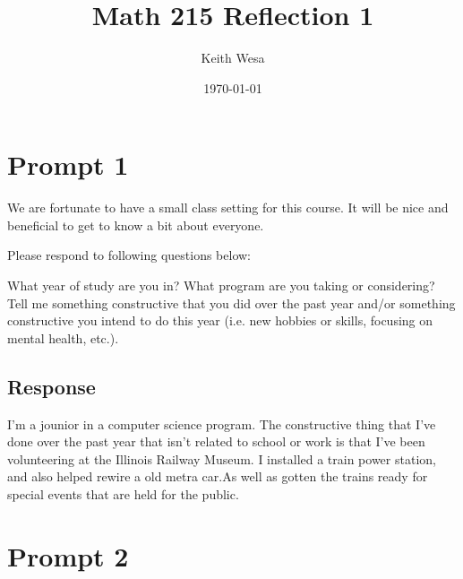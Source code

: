 \documentclass{article}
\title{Math 215 Reflection 1}
\author{Keith Wesa}
\date{\today}
\begin{document}
\maketitle 

\section{Prompt 1}

We are fortunate to have a small class setting for this course. It will be nice and beneficial
to get to know a bit about everyone.
\newline

Please respond to following questions below:
\newline

What year of study are you in? What program are you taking or considering? Tell me
something constructive that you did over the past year and/or something constructive you
intend to do this year (i.e. new hobbies or skills, focusing on mental health, etc.).
\subsection{Response}

    I'm a jounior in a computer science program. The constructive thing that I've done over the
past year that isn't related to school or work is that I've been volunteering at the Illinois
Railway Museum. I installed a train power station, and also helped rewire a old metra car.As 
well as gotten the trains ready for special events that are held for the public. 
\section{Prompt 2}
\end{document}
